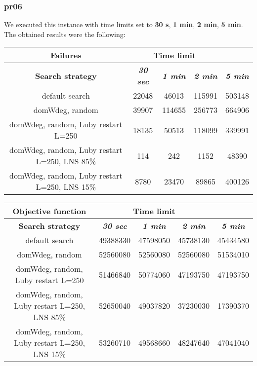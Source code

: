 \subsubsection{pr06}
We executed this instance with time limits set to \textbf{30 s}, \textbf{1 min}, \textbf{2 min}, \textbf{5 min}.\\
The obtained results were the following:
{
\renewcommand{\arraystretch}{2}
\begin{longtable}[h]{| c | c | c | c | c |}
    \hline
    \textbf{Failures} & \multicolumn{3}{c}{Time limit} & \\
    \hline
    \textbf{Search strategy} & \textbf{\textit{30 sec}} & \textbf{\textit{1 min}} & \textbf{\textit{2 min}} & \textbf{\textit{5 min}} \\
    \hline
    \endhead
    default search                                & 22048 &  46013 & 115991 & 503148 \\
    \hline
    domWdeg, random                               & 39907 & 114655 & 256773 & 664906 \\
    \hline
    domWdeg, random, Luby restart L=250           & 18135 &  50513 & 118099 & 339991 \\
    \hline
    domWdeg, random, Luby restart L=250, LNS 85\% &   114 &    242 &   1152 &  48390 \\
    \hline
    domWdeg, random, Luby restart L=250, LNS 15\% &  8780 &  23470 &  89865 & 400126 \\
    \hline
\end{longtable}
}

{
\renewcommand{\arraystretch}{2}
\begin{longtable}[h]{| c | c | c | c | c |}
    \hline
    \textbf{Objective function} & \multicolumn{3}{c}{Time limit} & \\
    \hline
    \textbf{Search strategy} & \textbf{\textit{30 sec}} & \textbf{\textit{1 min}} & \textbf{\textit{2 min}} & \textbf{\textit{5 min}} \\
    \hline
    \endhead
    default search                                & 49388330 & 47598050 & 45738130 & 45434580 \\
    \hline
    domWdeg, random                               & 52560080 & 52560080 & 52560080 & 51534010 \\
    \hline
    domWdeg, random, Luby restart L=250           & 51466840 & 50774060 & 47193750 & 47193750 \\
    \hline
    domWdeg, random, Luby restart L=250, LNS 85\% & 52650040 & 49037820 & 37230030 & 17390370 \\
    \hline
    domWdeg, random, Luby restart L=250, LNS 15\% & 53260710 & 49568660 & 48247640 & 47041040 \\
    \hline
\end{longtable}
}